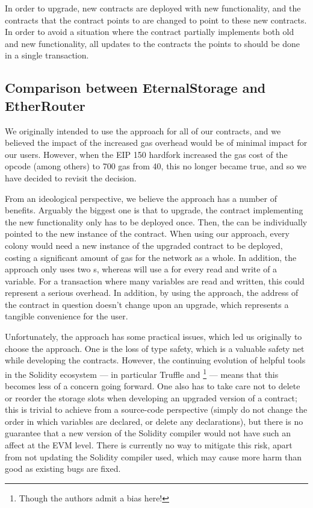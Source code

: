 In order to upgrade, new contracts are deployed with new functionality, and the contracts that the  contract points to are changed to point to these new contracts. In order to avoid a situation where the contract partially implements both old and new functionality, all updates to the contracts the  points to should be done in a single transaction.

\subsection{Comparison between EternalStorage and EtherRouter}

We originally intended to use the  approach for all of our contracts, and we believed the impact of the increased gas overhead would be of minimal impact for our users.  However, when the EIP 150 hardfork\cite{EIP150} increased the gas cost of the opcode  (among others) to 700 gas from 40, this no longer became true, and so we have decided to revisit the decision.

From an ideological perspective, we believe the  approach has a number of benefits. Arguably the biggest one is that to upgrade, the contract implementing the new functionality only has to be deployed once. Then, the  can be individually pointed to the new instance of the contract. When using our  approach, every colony would need a new instance of the upgraded contract to be deployed, costing a significant amount of gas for the network as a whole. In addition, the  approach only uses two s, whereas  will use a  for every read and write of a variable. For a transaction where many variables are read and written, this could represent a serious overhead. In addition, by using the  approach, the address of the contract in question doesn't change upon an upgrade, which represents a tangible convenience for the user.

Unfortunately, the  approach has some practical issues, which led us originally to choose the   approach. One is the loss of type safety, which is a valuable safety net while developing the contracts. However, the continuing evolution of helpful tools in the Solidity ecosystem --- in particular Truffle and  \footnote{Though the authors admit a bias here!} --- means that this becomes less of a concern going forward. One also has to take care not to delete or reorder the storage slots when developing an upgraded version of a contract; this is trivial to achieve from a source-code perspective (simply do not change the order in which variables are declared, or delete any declarations), but there is no guarantee that a new version of the Solidity compiler would not have such an affect at the EVM level. There is currently no way to mitigate this risk, apart from not updating the Solidity compiler used, which may cause more harm than good as existing bugs are fixed.

